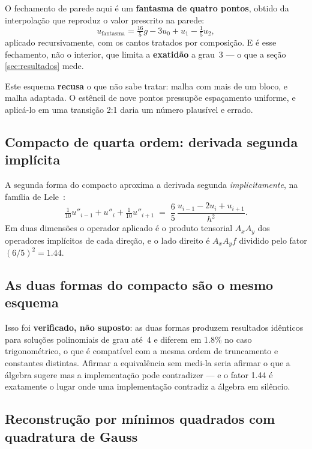 O fechamento de parede aqui é um \textbf{fantasma de quatro pontos}, obtido da
interpolação que reproduz o valor prescrito na parede:
\begin{equation}
  u_{\text{fantasma}} = \tfrac{16}{5}g - 3u_0 + u_1 - \tfrac{1}{5}u_2 ,
  \label{eq:fantasma4}
\end{equation}
aplicado recursivamente, com os cantos tratados por composição. E é esse
fechamento, não o interior, que limita a \textbf{exatidão} a grau~3 --- o que a
seção \ref{sec:resultados} mede.

Este esquema \textbf{recusa} o que não sabe tratar: malha com mais de um bloco, e
malha adaptada. O estêncil de nove pontos pressupõe espaçamento uniforme, e
aplicá-lo em uma transição 2:1 daria um número plausível e errado.

\subsection{Compacto de quarta ordem: derivada segunda implícita}
\label{sec:aprox-lele}

A segunda forma do compacto aproxima a derivada segunda \emph{implicitamente},
na família de Lele~\cite{lele1992}:
\begin{equation}
  \tfrac{1}{10}u''_{i-1} + u''_i + \tfrac{1}{10}u''_{i+1}
  \;=\;
  \frac{6}{5}\,\frac{u_{i-1}-2u_i+u_{i+1}}{h^2}.
  \label{eq:lele}
\end{equation}
Em duas dimensões o operador aplicado é o produto tensorial $A_x A_y$ dos
operadores implícitos de cada direção, e o lado direito é $A_x A_y f$ dividido
pelo fator $(6/5)^2 = \num{1.44}$.

\subsection{As duas formas do compacto são o mesmo esquema}
\label{sec:aprox-equiv}

Isso foi \textbf{verificado, não suposto}: as duas formas produzem resultados
idênticos para soluções polinomiais de grau até~4 e diferem em \num{1.8}\% no
caso trigonométrico, o que é compatível com a mesma ordem de truncamento e
constantes distintas. Afirmar a equivalência sem medi-la seria afirmar o que a
álgebra sugere mas a implementação pode contradizer --- e o fator \num{1.44} é
exatamente o lugar onde uma implementação contradiz a álgebra em silêncio.

\subsection{Reconstrução por mínimos quadrados com quadratura de Gauss}
\label{sec:aprox-mlsgauss}

